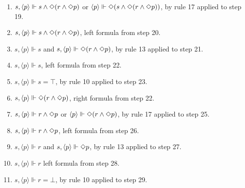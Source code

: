 \begin{myEx}
\begin{enumerate}
\item $s, \langle p \rangle \Vdash s \land \Diamond(r \land \Diamond p)$ or $\langle p \rangle \Vdash \Diamond(s \land \Diamond(r \land \Diamond p))$, by rule 17 applied to step 19.\\ %

\item $s, \langle p \rangle \Vdash s \land \Diamond(r \land \Diamond p)$, left formula from step 20.\\ %

\item $s, \langle p \rangle \Vdash s$ and $s, \langle p \rangle \Vdash \Diamond(r \land \Diamond p)$, by rule 13 applied to step 21.\\ %

\item $s, \langle p \rangle \Vdash s$, left formula from step 22.\\ %

\item $s, \langle p \rangle \Vdash s = \top$, by rule 10 applied to step 23.\\ %

\item $s, \langle p \rangle \Vdash \Diamond(r \land \Diamond p)$, right formula from step 22.\\ %

\item $s, \langle p \rangle \Vdash r \land \Diamond p$ or $\langle p \rangle \Vdash \Diamond(r \land \Diamond p)$, by rule 17 applied to step 25.\\ %

\item $s, \langle p \rangle \Vdash r \land \Diamond p$, left formula from step 26.\\ %

\item $s, \langle p \rangle \Vdash r$ and $s, \langle p \rangle \Vdash \Diamond p$, by rule 13 applied to step 27.\\ %

\item $s, \langle p \rangle \Vdash r$ left formula from step 28.\\ %

\item $s, \langle p \rangle \Vdash r = \bot$, by rule 10 applied to step 29.\\ %


\end{enumerate}
\end{myEx}
